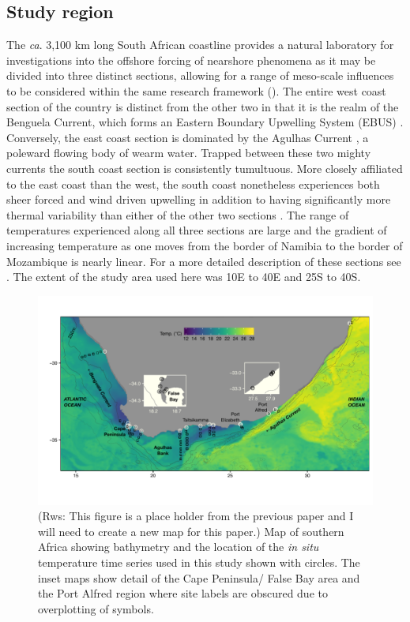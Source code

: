 \documentclass[a4paper,10pt,review]{elsarticle}
\begin{document}
\subsection{Study region}
The \emph{ca}. 3,100 km long South African coastline provides a natural laboratory for investigations into the offshore forcing of nearshore phenomena as it may be divided into three distinct sections, allowing for a range of meso-scale influences to be considered within the same research framework (). The entire west coast section of the country is distinct from the other two in that it is the realm of the Benguela Current, which forms an Eastern Boundary Upwelling System (EBUS) \citep{Hutchings2009}. Conversely, the east coast section is dominated by the Agulhas Current \citep{Luning1990}, a poleward flowing body of wearm water. Trapped between these two mighty currents the south coast section is consistently tumultuous. More closely affiliated to the east coast than the west, the south coast nonetheless experiences both sheer forced and wind driven upwelling in addition to having significantly more thermal variability than either of the other two sections \citep{Schlegel2016}. The range of temperatures experienced along all three sections are large and the gradient of increasing temperature as one moves from the border of Namibia to the border of Mozambique is nearly linear. For a more detailed description of these sections see \citet{Smit2013}. The extent of the study area used here was 10\degree E to 40\degree E and 25\degree S to 40\degree S.

\begin{figure}
\includegraphics[width=1.0\textwidth]{figure_1.pdf}
\caption{(Rws: This figure is a place holder from the previous paper and I will need to create a new map for this paper.) Map of southern Africa showing bathymetry and the location of the \emph{in situ} temperature time series used in this study shown with circles. The inset maps show detail of the Cape Peninsula/ False Bay area and the Port Alfred region where site labels are obscured due to overplotting of symbols.}
\label{figure1}
\end{figure}
\end{document}
